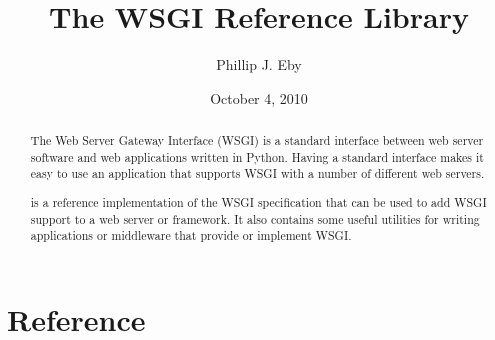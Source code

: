 \documentclass{manual}
\title{The WSGI Reference Library}
\author{Phillip J. Eby}
\date{October 4, 2010}       %
\begin{document}
\maketitle


%

\begin{abstract}
\noindent
The Web Server Gateway Interface (WSGI) is a standard interface
between web server software and web applications written in Python.
Having a standard interface makes it easy to use an application
that supports WSGI with a number of different web servers.

 is a reference implementation of the WSGI specification
that can be used to add WSGI support to a web server or framework.  It also
contains some useful utilities for writing applications or middleware that
provide or implement WSGI.
\end{abstract}

\tableofcontents

\chapter{Reference}













%
%
%
\renewcommand{\indexname}{Module Index}

\renewcommand{\indexname}{Index}
\end{document}

